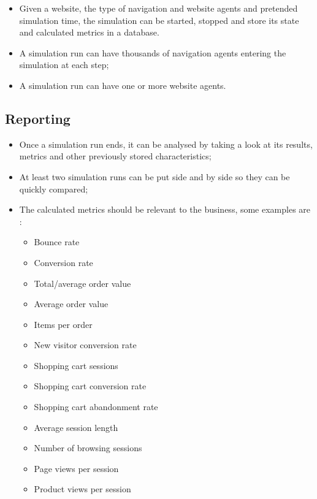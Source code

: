 \begin{itemize}
    \item Given a website, the type of navigation and website agents and 
    pretended simulation time, the simulation can be started, stopped and store 
    its state and calculated metrics in a database.
    \item A simulation run can have thousands of navigation agents entering the 
    simulation at each step;
    \item A simulation run can have one or more website agents.
\end{itemize}

\subsection{Reporting}

\begin{itemize}
    \item Once a simulation run ends, it can be analysed by taking a look at 
    its results, metrics and other previously stored characteristics;
    \item At least two simulation runs can be put side and by side so they can 
    be quickly compared;
    \item The calculated metrics should be relevant to the business, some 
    examples are \cite{Watson2015}:
    \begin{itemize}
        \item Bounce rate
        \item Conversion rate
        \item Total/average order value
        \item Average order value
        \item Items per order
        \item New visitor conversion rate
        \item Shopping cart sessions
        \item Shopping cart conversion rate
        \item Shopping cart abandonment rate
        \item Average session length
        \item Number of browsing sessions
        \item Page views per session
        \item Product views per session
    \end{itemize}
\end{itemize}

